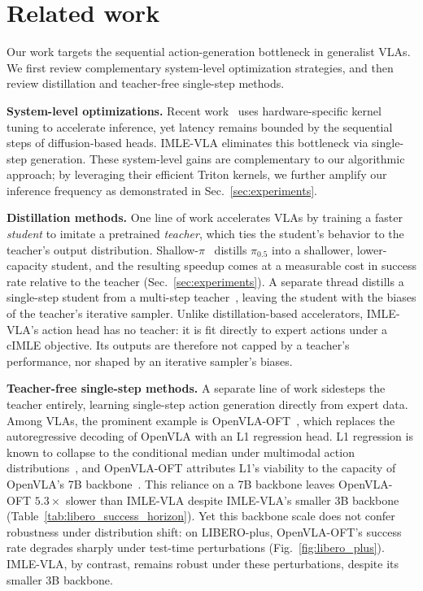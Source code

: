 \documentclass[letterpaper, 10 pt, conference]{ieeeconf}  %
\begin{document}
\section{Related work}\label{sec:related}
Our work targets the sequential action-generation bottleneck in generalist VLAs. We first review complementary system-level optimization strategies, and then review distillation and teacher-free single-step methods.

\textbf{System-level optimizations.}
Recent work~\cite{ma2025realtime} uses hardware-specific kernel tuning to accelerate inference, yet latency remains bounded by the sequential steps of diffusion-based heads. IMLE-VLA eliminates this bottleneck via single-step generation. These system-level gains are complementary to our algorithmic approach; by leveraging their efficient Triton kernels, we further amplify our inference frequency as demonstrated in Sec.~\ref{sec:experiments}.

\textbf{Distillation methods.}
One line of work accelerates VLAs by training a faster \emph{student} to imitate a pretrained \emph{teacher}, which ties the student's behavior to the teacher's output distribution. Shallow-$\pi$~\cite{jeon2025shallow} distills $\pi_{0.5}$ into a shallower, lower-capacity student, and the resulting speedup comes at a measurable cost in success rate relative to the teacher (Sec.~\ref{sec:experiments}). A separate thread distills a single-step student from a multi-step teacher~\cite{prasad2024consistency,wang2024onedp,Dong2026FromFT}, leaving the student with the biases of the teacher's iterative sampler. Unlike distillation-based accelerators, IMLE-VLA's action head has no teacher: it is fit directly to expert actions under a cIMLE objective. Its outputs are therefore not capped by a teacher's performance, nor shaped by an iterative sampler's biases.


\textbf{Teacher-free single-step methods.}
A separate line of work sidesteps the teacher entirely, learning single-step action generation directly from expert data. Among VLAs, the prominent example is OpenVLA-OFT~\cite{kim2025openvlaoft}, which replaces the autoregressive decoding of OpenVLA with an L1 regression head. L1 regression is known to collapse to the conditional median under multimodal action distributions~\cite{chi2023diffusionpolicy,shafiullah2022bet,black2024pi0}, and OpenVLA-OFT attributes L1's viability to the capacity of OpenVLA's 7B backbone~\cite{kim2025openvlaoft}. This reliance on a 7B backbone leaves OpenVLA-OFT $5.3\times$ slower than IMLE-VLA despite IMLE-VLA's smaller 3B backbone (Table~\ref{tab:libero_success_horizon}). Yet this backbone scale does not confer robustness under distribution shift: on LIBERO-plus, OpenVLA-OFT's success rate degrades sharply under test-time perturbations (Fig.~\ref{fig:libero_plus}). IMLE-VLA, by contrast, remains robust under these perturbations, despite its smaller 3B backbone.
\end{document}
